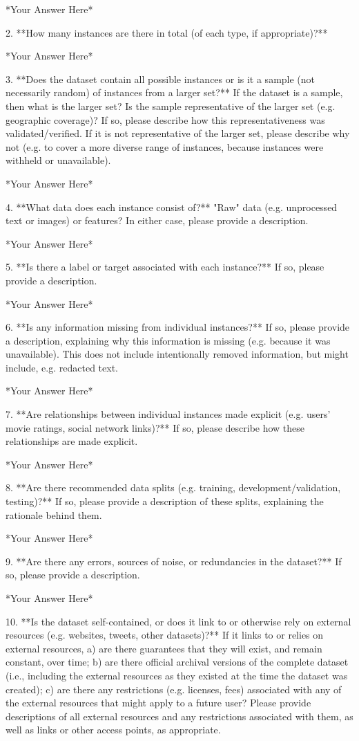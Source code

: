 	*Your Answer Here*

2. **How many instances are there in total (of each type, if appropriate)?**

	*Your Answer Here*

3. **Does the dataset contain all possible instances or is it a sample (not necessarily random) of instances from a larger set?** If the dataset is a sample, then what is the larger set? Is the sample representative of the larger set (e.g. geographic coverage)? If so, please describe how this representativeness was validated/verified. If it is not representative of the larger set, please describe why not (e.g. to cover a more diverse range of instances, because instances were withheld or unavailable).

	*Your Answer Here*

4. **What data does each instance consist of?** "Raw" data (e.g. unprocessed text or images) or features? In either case, please provide a description.

	*Your Answer Here*

5. **Is there a label or target associated with each instance?** If so, please provide a description.

	*Your Answer Here*

6. **Is any information missing from individual instances?** If so, please provide a description, explaining why this information is missing (e.g. because it was unavailable). This does not include intentionally removed information, but might include, e.g. redacted text.

	*Your Answer Here*

7. **Are relationships between individual instances made explicit (e.g. users' movie ratings, social network links)?** If so, please describe how these relationships are made explicit.

	*Your Answer Here*

8. **Are there recommended data splits (e.g. training, development/validation, testing)?** If so, please provide a description of these splits, explaining the rationale behind them.

	*Your Answer Here*

9. **Are there any errors, sources of noise, or redundancies in the dataset?** If so, please provide a description.

	*Your Answer Here*

10. **Is the dataset self-contained, or does it link to or otherwise rely on external resources (e.g. websites, tweets, other datasets)?** If it links to or relies on external resources, a) are there guarantees that they will exist, and remain constant, over time; b) are there official archival versions of the complete dataset (i.e., including the external resources as they existed at the time the dataset was created); c) are there any restrictions (e.g. licenses, fees) associated with any of the external resources that might apply to a future user? Please provide descriptions of all external resources and any restrictions associated with them, as well as links or other access points, as appropriate.

